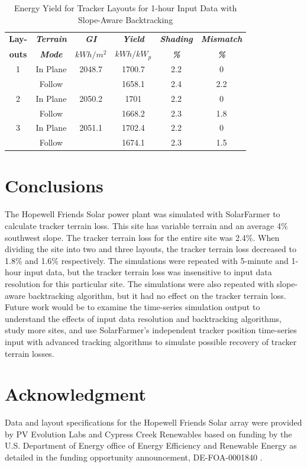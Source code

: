 \documentclass[conference]{IEEEtran}
\begin{document}
\begin{table}[htbp]
\caption{Energy Yield for Tracker Layouts for 1-hour Input Data with Slope-Aware Backtracking}
\begin{center}
\begin{tabular}{|c|c|c|c|c|c|}
\hline
\textbf{Lay-}& \textbf{\textit{Terrain}}& \textbf{\textit{GI}}&        \textbf{\textit{Yield}}&        \textbf{\textit{Shading}}& \textbf{\textit{Mismatch}} \\
\textbf{outs}& \textbf{\textit{Mode}}&    \textbf{\textit{$kWh/m^2$}}& \textbf{\textit{$kWh / kW_p$}}& \textbf{\textit{\%}}&      \textbf{\textit{\%}} \\
\hline
1& In Plane& 2048.7&  1700.7& 2.2& 0 \\
 & Follow&         &  1658.1& 2.4& 2.2 \\
\hline
2& In Plane& 2050.2&  1701&   2.2& 0 \\
 & Follow&         &  1668.2& 2.3& 1.8 \\
\hline
3& In Plane& 2051.1&  1702.4& 2.2& 0 \\
 & Follow&         &  1674.1& 2.3& 1.5 \\
\hline
\end{tabular}
\label{table:slope-1hr}
\end{center}
\end{table}

\section{Conclusions}
The Hopewell Friends Solar power plant was simulated with SolarFarmer to calculate tracker terrain loss. This site has variable terrain and an average 4\% southwest slope. The tracker terrain loss for the entire site was 2.4\%. When dividing the site into two and three layouts, the tracker terrain loss decreased to 1.8\% and 1.6\% respectively. The simulations were repeated with 5-minute and 1-hour input data, but the tracker terrain loss was insensitive to input data resolution for this particular site. The simulations were also repeated with slope-aware backtracking algorithm, but it had no effect on the tracker terrain loss. Future work would be to examine the time-series simulation output to understand the effects of input data resolution and backtracking algorithms, study more sites, and use SolarFarmer's independent tracker position time-series input with advanced tracking algorithms to simulate possible recovery of tracker terrain losses.

\section*{Acknowledgment}

Data and layout specifications for the Hopewell Friends Solar array were provided by PV Evolution Labs and Cypress Creek Renewables based on funding by the U.S. Department of Energy office of Energy Efficiency and Renewable Energy as detailed in the funding opportunity announcement, DE-FOA-0001840 \cite{CypressCreekRenewables2019}.



\end{document}
